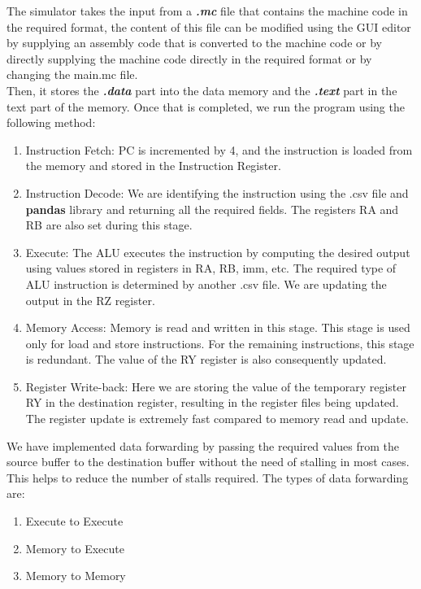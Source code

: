 \documentclass{article}
\begin{document}
The simulator takes the input from a \textsl{\textbf{.mc}} file that contains the machine code in the required format, the content of this file can be modified using the GUI editor by supplying an assembly code that is converted to the machine code or by directly supplying the machine code directly in the required format or by changing the main.mc file.\\
Then, it stores the \textsl{\textbf{.data}} part into the data memory and the \textsl{\textbf{.text}} part in the text part of the memory.
Once that is completed, we run the program using the following method:
\begin{enumerate}
\item Instruction Fetch: PC is incremented by 4, and the instruction is loaded from the memory and stored in the Instruction Register.
\item Instruction Decode: We are identifying the instruction using the .csv file and {\bf pandas} library and returning all the required fields. The registers RA and RB are also set during this stage.
\item Execute: The ALU executes the instruction by computing the desired output using values stored in registers in RA, RB, imm, etc. The required type of ALU instruction is determined by another .csv file. We are updating the output in the RZ register.
\item Memory Access: Memory is read and written in this stage. This stage is used only for load and store instructions. For the remaining instructions, this stage is redundant. The value of the RY register is also consequently updated.
\newpage
\item Register Write-back: Here we are storing the value of the temporary register RY in the destination register, resulting in the register files being updated. The register update is extremely fast compared to memory read and update.\\
\end{enumerate}
We have implemented data forwarding by passing the required values from the source buffer to the destination buffer without the need of stalling in most cases. This helps to reduce the number of stalls required. The types of data forwarding are:\\
\begin{enumerate}
    \item Execute to Execute
    \item Memory to Execute
    \item Memory to Memory
\end{enumerate}
\vspace{1cm}
\end{document}
